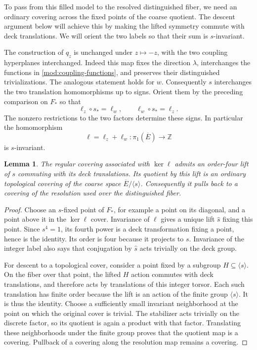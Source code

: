 \documentclass[11pt,reqno]{amsart}
\numberwithin{equation}{section}
\newtheorem{lemma}[theorem]{Lemma}
\theoremstyle{definition}
\theoremstyle{remark}
\newcommand{\Z}{\mathbb Z}
\begin{document}
To pass from this filled model to the resolved distinguished fiber,
we need an ordinary covering across the fixed points of the coarse
quotient.  The descent argument below will achieve this by making the
lifted symmetry commute with deck translations.  We will orient the
two labels so that their sum is $s$-invariant.

The construction of $q_z$ is unchanged under $z\mapsto-z$, with
the two coupling hyperplanes interchanged.  Indeed this map fixes
the direction $\lambda$, interchanges the functions in
\eqref{mod:coupling-functions}, and preserves their distinguished
trivializations.  The analogous statement holds for $w$.
Consequently $s$ interchanges the two translation homomorphisms up
to signs.  Orient them by the preceding comparison on $F_*$ so that
\[
 \ell_z\circ s_* =\ell_w,
 \qquad \ell_w\circ s_* =\ell_z.
\]
The nonzero restrictions to the two factors determine these signs.
In particular the homomorphism
\begin{equation}\label{mod:sum-label}
 \ell=\ell_z+\ell_w:\pi_1(\overline E)\longrightarrow\Z
\end{equation}
is $s$-invariant.

\begin{lemma}\label{mod:central}
The regular covering associated with $\ker\ell$ admits an order-four
lift of $s$ commuting with its deck translations.  Its quotient by
this lift is an ordinary topological covering of the coarse space
$\overline E/\langle s\rangle$.  Consequently it pulls back to a
covering of the resolution used over the distinguished fiber.
\end{lemma}
\begin{proof}
Choose an $s$-fixed point of $F_*$, for example a point on its
diagonal, and a point above it in the $\ker\ell$ cover.  Invariance
of $\ell$ gives a unique lift $\widehat s$ fixing this point.  Since
$s^4=1$, its fourth power is a deck transformation fixing a point,
hence is the identity.  Its order is four because it projects to
$s$.  Invariance of the integer label also says that conjugation
by $\widehat s$ acts trivially on the deck group.

For descent to a topological cover, consider a point fixed by a
subgroup $H\subseteq\langle s\rangle$.  On the fiber over that
point, the lifted $H$ action commutes with deck translations, and
therefore acts by translations of this integer torsor.  Each such
translation has finite order because the lift is an action of the
finite group $\langle s\rangle$.  It is thus the identity.  Choose
a sufficiently small invariant neighborhood at the point on which
the original cover is trivial.  The stabilizer acts trivially on
the discrete factor, so its quotient is again a product with that
factor.  Translating these neighborhoods under the finite group
proves that the quotient map is a covering.  Pullback of a covering
along the resolution map remains a covering.
\end{proof}
\end{document}
